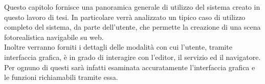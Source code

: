 Questo capitolo fornisce una panoramica generale di utilizzo del sistema creato in questo lavoro di tesi. In particolare verrà analizzato un tipico caso di utilizzo completo del sistema, da parte dell'utente, che permette la creazione di una scena fotorealistica navigabile su web.
\\
Inoltre verranno forniti i dettagli delle modalità con cui l'utente, tramite interfaccia grafica, è in grado di interagire con l'editor, il servizio ed il navigatore. 
\\
Per ognuno di questi sarà infatti esaminata accuratamente l'interfaccia grafica e le funzioni richiamabili tramite essa.